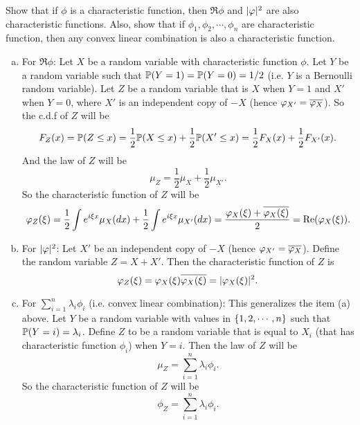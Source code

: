 \begin{problem}
	Show that if $ \phi $ is a characteristic function, then $ \Re \phi $ and $ |\varphi|^2 $ are also characteristic functions. Also, show that if $ \phi_1,\phi_2,\cdots,\phi_n $ are characteristic function, then any convex linear combination is also a characteristic function.
\end{problem}
\begin{solution}
	\begin{enumerate}[(a)]
		\item For $ \Re\phi $: Let $ X $ be a random variable with characteristic function $ \phi $. Let $ Y $ be a random variable such that $ \mathbb{P}(Y=1) = \mathbb{P}(Y=0)=1/2 $ (i.e. $ Y $ is a Bernoulli random variable). Let $ Z $ be a random variable that is $ X $ when $ Y = 1 $ and $ X' $ when $ Y = 0 $, where $ X' $ is an independent copy of $ -X $ (hence $ \varphi_{X'}=\overline{\varphi_X} $). So the c.d.f of $ Z $ will be
		\[ F_Z(x) = \mathbb{P}(Z \leq x) = \frac{1}{2} \mathbb{P}(X\leq x) + \frac{1}{2}\mathbb{P}(X'\leq x) = \frac{1}{2}F_X(x) + \frac{1}{2}F_{X'}(x). \]
		And the law of $ Z $ will be
		\[ \mu_Z = \frac{1}{2}\mu_X + \frac{1}{2}\mu_{X'}. \]
		So the characteristic function of $ Z $ will be
		\[ \varphi_Z(\xi) = \frac{1}{2}\int e^{i\xi x} \mu_X(dx) + \frac{1}{2}\int e^{i\xi x} \mu_{X'}(dx) = \frac{\varphi_X(\xi) + \overline{\varphi_{X}(\xi)}}{2} = \operatorname{Re}(\varphi_X(\xi)). \]
		
		\item For $ |\varphi|^2 $: Let $ X' $ be an independent copy of $ -X $ (hence $ \varphi_{X'} = \overline{\varphi_X} $). Define the random variable $ Z = X + X' $. Then the characteristic function of $ Z $ is 
		\[ \varphi_Z(\xi) = \varphi_{X}(\xi) \overline{\varphi_X(\xi)} = |\varphi_X(\xi)|^2. \]
		
		\item For $ \sum_{i=1}^{n}\lambda_i \phi_i $ (i.e. convex linear combination): This generalizes the item (a) above. Let $ Y $ be a random variable with values in $ \{1,2,\cdots,n\} $ such that $ \mathbb{P}(Y = i) =\lambda_i $. Define $ Z $ to be a random variable that is equal to $ X_i $ (that has characteristic function $ \phi_i $) when $ Y = i $. Then the law of $ Z $ will be
		\[ \mu_Z =  \sum_{i=1}^{n} \lambda_i \phi_i. \]
		So the characteristic function of $ Z $ will be
		\[ \phi_Z = \sum_{i=1}^{n} \lambda_i \phi_i. \]
	\end{enumerate}
	
\end{solution}

